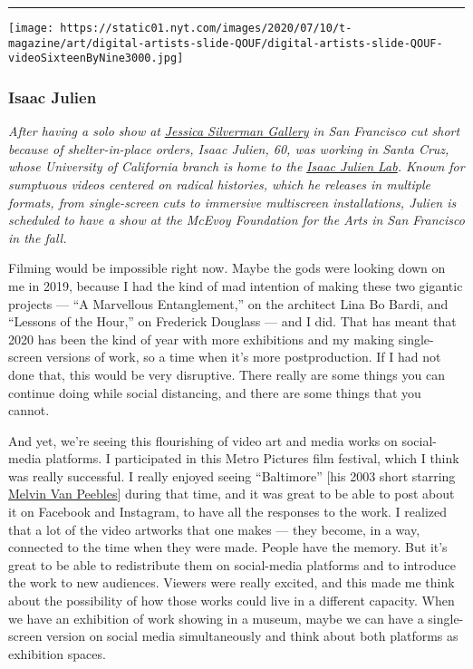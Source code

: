 \begin{center}\rule{0.5\linewidth}{\linethickness}\end{center}

\texttt{[image: https://static01.nyt.com/images/2020/07/10/t-magazine/art/digital-artists-slide-QOUF/digital-artists-slide-QOUF-videoSixteenByNine3000.jpg]}

\hypertarget{isaac-julien}{%
\subsubsection{\texorpdfstring{\textbf{Isaac
Julien}}{Isaac Julien}}\label{isaac-julien}}

\emph{After having a solo show at}
\href{https://www.nytimes.com/2020/01/22/t-magazine/jessica-silverman-gallery.html}{\emph{Jessica
Silverman Gallery}} \emph{in San Francisco cut short because of
shelter-in-place orders, Isaac Julien, 60, was working in Santa Cruz,
whose University of California branch is home to the}
\href{https://danm.ucsc.edu/project_group/isaac-julien-lab}{\emph{Isaac
Julien Lab}}\emph{. Known for sumptuous videos centered on radical
histories, which he releases in multiple formats, from single-screen
cuts to immersive multiscreen installations, Julien is scheduled to have
a show at the McEvoy Foundation for the Arts in San Francisco in the
fall.}

Filming would be impossible right now. Maybe the gods were looking down
on me in 2019, because I had the kind of mad intention of making these
two gigantic projects --- ``A Marvellous Entanglement,'' on the
architect Lina Bo Bardi, and ``Lessons of the Hour,'' on Frederick
Douglass --- and I did. That has meant that 2020 has been the kind of
year with more exhibitions and my making single-screen versions of work,
so a time when it's more postproduction. If I had not done that, this
would be very disruptive. There really are some things you can continue
doing while social distancing, and there are some things that you
cannot.

And yet, we're seeing this flourishing of video art and media works on
social-media platforms. I participated in this Metro Pictures film
festival, which I think was really successful. I really enjoyed seeing
``Baltimore'' {[}his 2003 short starring
\href{https://www.nytimes.com/2013/09/20/arts/design/melvin-van-peebles-headlines-a-group-art-show.html}{Melvin
Van Peebles}{]} during that time, and it was great to be able to post
about it on Facebook and Instagram, to have all the responses to the
work. I realized that a lot of the video artworks that one makes ---
they become, in a way, connected to the time when they were made. People
have the memory. But it's great to be able to redistribute them on
social-media platforms and to introduce the work to new audiences.
Viewers were really excited, and this made me think about the
possibility of how those works could live in a different capacity. When
we have an exhibition of work showing in a museum, maybe we can have a
single-screen version on social media simultaneously and think about
both platforms as exhibition spaces.

